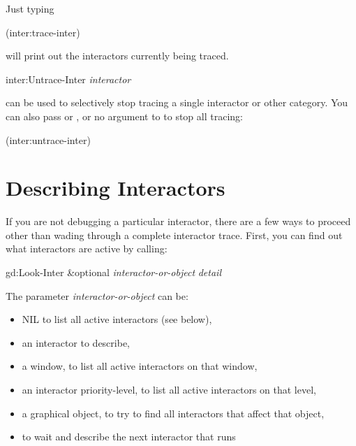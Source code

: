 Just typing
\begin{programexample}
(inter:trace-inter)
\end{programexample}
will print out the interactors currently being traced.

\begin{programexample}
inter:Untrace-Inter {\it interactor}\value{function}
\end{programexample}
can be used to selectively stop tracing a single interactor or
other category.  You can also
pass  or , or no argument to  to stop all tracing:
\begin{programexample}
(inter:untrace-inter)
\end{programexample}


\section{Describing Interactors}
If you are not debugging a particular interactor, there are a few
ways to proceed other than wading through a complete interactor trace.
First, you can find out what interactors are active by calling:
\begin{programexample}
gd:Look-Inter \&optional {\it interactor-or-object} {\it detail}\value{function}
\end{programexample}

The parameter {\it interactor-or-object} can be:

\begin{itemize}
\item NIL to list all active interactors (see below),

\item an interactor to describe,

\item a window, to list all active interactors on that window,

\item an interactor priority-level, to list all active interactors on that level,

\item a graphical object, to try to find all interactors that affect that object,

\item {} to wait and describe the next interactor that runs
\end{itemize}

